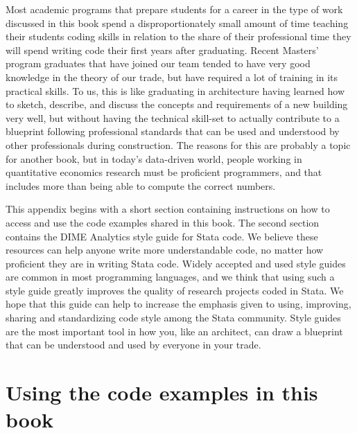 
\begin{fullwidth}

Most academic programs that prepare students for a career
in the type of work discussed in this book
spend a disproportionately small amount of time teaching their students coding skills
in relation to the share of their professional time they will spend writing code
their first years after graduating.
Recent Masters' program graduates that have joined our team
tended to have very good knowledge in the theory of our
trade, but have required a lot of training in its practical skills.
To us, this is like graduating  in architecture having learned
how to sketch, describe, and discuss
the concepts and requirements of a new building very well,
but without having the technical skill-set
to actually contribute to a blueprint following professional standards
that can be used and understood by other professionals during construction.
The reasons for this are probably a topic for another book,
but in today's data-driven world,
people working in quantitative economics research must be proficient programmers,
and that includes more than being able to compute the correct numbers.

This appendix begins with a short section containing instructions
on how to access and use the code examples shared in this book.
The second section contains the DIME Analytics style guide for Stata code.
We believe these resources can help anyone write more understandable code,
no matter how proficient they are in writing Stata code.
Widely accepted and used style guides are common in most programming languages,
and we think that using such a style guide greatly improves the quality
of research projects coded in Stata.
We hope that this guide can  help to increase the emphasis
given to using, improving, sharing and standardizing code style among the Stata community.
Style guides are the most important tool in how you, like an architect,
can draw a blueprint that can be understood and used by everyone in your trade.

\end{fullwidth}


\section{Using the code examples in this book}

